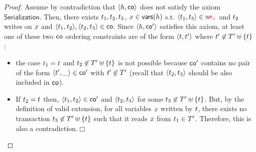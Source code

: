 \begin{proof}
 
Assume by contradiction that $\tup{\hist, \co}$ does not satisfy the axiom $\mathsf{Serialization}$. Then, there exists $\tr_1, \tr_2, \tr_3$, $\xvar \in \vars{\hist}$ s.t. $\tup{\tr_1, \tr_3} \in \wro[\xvar]$ and $\tr_2$ writes on $\xvar$ and $\tup{\tr_1, \tr_2}, \tup{\tr_2, \tr_3} \in \co$. Since $\tup{\hist,\co'}$ satisfies this axiom, at least one of these two $\co$ ordering constraints are of the form $\tup{\tr, \tr'}$ where $\tr' \not\in T' \uplus \{\tr\}$:
       \begin{itemize}
        \item the case $\tr_1 = \tr$ and $\tr_2 \not\in T' \uplus \{\tr\}$ is not possible because $\co'$ contains no pair of the form $\tup{\tr', \_} \in \co'$ with $\tr' \not\in T'$ (recall that $\tup{\tr_2, \tr_3}$ should be also included in $\co$). 
        \item If $\tr_2 = \tr$ then, $\tup{\tr_1, \tr_2} \in \co'$ and $\tup{\tr_2, \tr_3}$ for some $\tr_3 \not\in T' \uplus \{\tr\}$. But, by the definition of valid extension, for all variables $\xvar$ written by $\tr$, there exists no transaction $\tr_3 \not\in T' \uplus \{\tr\}$ such that it reads $\xvar$ from $\tr_1 \in T'$. Therefore, this is also a contradiction.\hfill $\Box$
       \end{itemize}
 \vspace{-3mm}
\end{proof}
